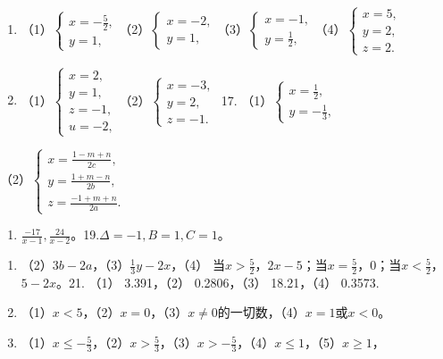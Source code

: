 \begin{enumerate}[start=15]
\item
  （1）\(\left\{ \begin{array}{l} x = -\frac{5}{2}, \\ y = 1, \end{array} \right.\)（2）\(\left\{ \begin{array}{l} x = -2, \\ y = 1, \end{array} \right.\)（3）\(\left\{ \begin{array}{l} x = -1, \\ y = \frac{1}{2}, \end{array} \right.\)（4）\(\left\{ \begin{array}{l} x = 5, \\ y = 2, \\ z = 2. \end{array} \right.\)
\item
  （1）\(\left\{ \begin{array}{l} x = 2, \\ y = 1, \\ z = -1, \\ u = -2, \end{array} \right.\)（2）\(\left\{ \begin{array}{l} x = -3, \\ y = 2, \\ z = -1. \end{array} \right.\)
  17.
  （1）\(\left\{ \begin{array}{l} x = \frac{1}{2}, \\ y = -\frac{1}{3}, \end{array} \right.\)
\end{enumerate}

（2）\(\left\{ \begin{array}{l} x = \frac{1 - m + n}{2c}, \\ y = \frac{1 + m - n}{2b}, \\ z = \frac{-1 + m + n}{2a}. \end{array} \right.\)
\begin{enumerate}[start=18]
\item
  \(\frac{-17}{x - 1}, \frac{24}{x - 2}\)。19.\(\Delta = -1, B = 1, C = 1\)。
\end{enumerate}

\begin{enumerate}[start=20]
\item
  （2）\(3b - 2a\)，（3）\(\frac{1}{3} y - 2x\)，（4）
  当\(x > \frac{5}{2}\)，\(2x - 5\)；当\(x = \frac{5}{2}\)，0；当\(x < \frac{5}{2}\)，\(5 - 2x\)。21.
  （1） 3.391，（2） 0.2806，（3） 18.21，（4） 0.3573.
\item
  （1）\(x < 5\)，（2）\(x = 0\)，（3）\(x \neq 0\)的一切数，（4）\(x = 1\)或\(x < 0\)。
\item
  （1）\(x \leqslant -\frac{5}{3}\)，（2）\(x > \frac{5}{3}\)，（3）\(x > -\frac{5}{3}\)，（4）\(x \leqslant 1\)，（5）\(x \geqslant 1\)，
\end{enumerate}

